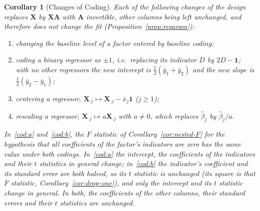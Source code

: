 \documentclass[14pt]{extarticle}
\theoremstyle{plain}
\newtheorem{corollary}[theorem]{Corollary}
\theoremstyle{definition}
\theoremstyle{remark}
\newcommand{\bX}{\mathbf{X}}
\newcommand{\bone}{\mathbf{1}}
\newcommand{\bA}{\mathbf{A}}
\begin{document}
\begin{corollary}[Changes of Coding]\label{cor:coding}
Each of the following changes of the design replaces $\bX$ by $\bX\bA$ with $\bA$ invertible, other columns being left unchanged, and therefore does not change the fit (Proposition~\ref{prop:reparam}):
\begin{enumerate}[label=\textup{(\alph*)}]
\item\label{cod:a} changing the baseline level of a factor entered by baseline coding;
\item\label{cod:b} coding a binary regressor as $\pm 1$, i.e.\ replacing its indicator $D$ by $2D - \bone$; with no other regressors the new intercept is $\frac{1}{2}(\bar y_1 + \bar y_2)$ and the new slope is $\frac{1}{2}(\bar y_2 - \bar y_1)$;
\item centering a regressor, $\bX_{\cdot j} \mapsto \bX_{\cdot j} - \bar x_j\bone$ ($j \geqslant 1$);
\item rescaling a regressor, $\bX_{\cdot j} \mapsto a\bX_{\cdot j}$ with $a \neq 0$, which replaces $\hat\beta_j$ by $\hat\beta_j/a$.
\end{enumerate}
In~\ref{cod:a} and~\ref{cod:b}, the $F$ statistic of Corollary~\ref{cor:nested-F} for the hypothesis that all coefficients of the factor's indicators are zero has the same value under both codings. In~\ref{cod:a} the intercept, the coefficients of the indicators and their $t$ statistics in general change; in~\ref{cod:b} the indicator's coefficient and its standard error are both halved, so its $t$ statistic is unchanged (its square is that $F$ statistic, Corollary~\ref{cor:drop-one}), and only the intercept and its $t$ statistic change in general. In both, the coefficients of the other columns, their standard errors and their $t$ statistics are unchanged.
\end{corollary}
\end{document}
